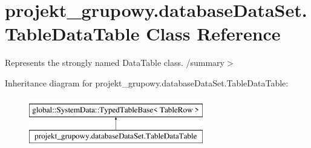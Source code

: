 \hypertarget{classprojekt__grupowy_1_1database_data_set_1_1_table_data_table}{}\section{projekt\+\_\+grupowy.\+database\+Data\+Set.\+Table\+Data\+Table Class Reference}
\label{classprojekt__grupowy_1_1database_data_set_1_1_table_data_table}


Represents the strongly named Data\+Table class. /summary$>$  


Inheritance diagram for projekt\+\_\+grupowy.\+database\+Data\+Set.\+Table\+Data\+Table\+:\begin{figure}[H]
\begin{center}
\leavevmode
\includegraphics[height=2.000000cm]{classprojekt__grupowy_1_1database_data_set_1_1_table_data_table}
\end{center}
\end{figure}
